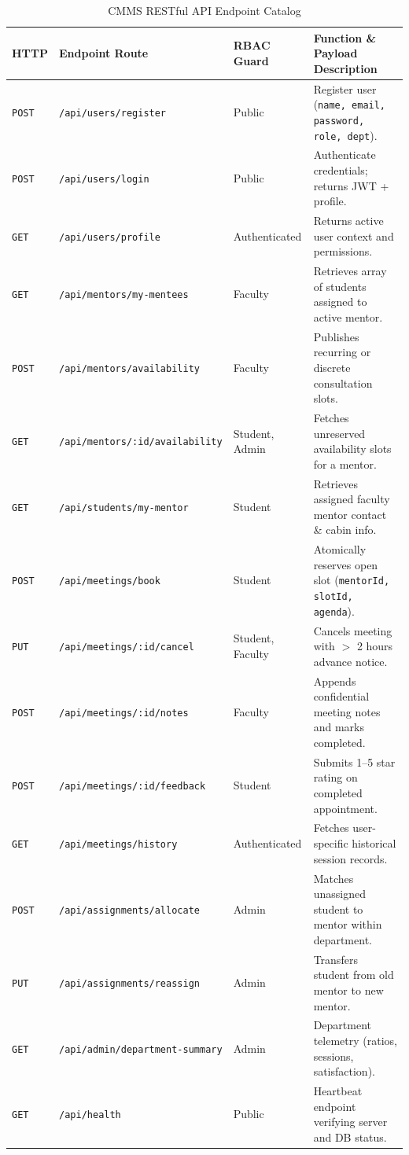 \documentclass[11pt,a4paper]{article}
\begin{document}
\begin{table}[H]
\centering
\footnotesize
\begin{tabularx}{\textwidth}{lp{4.2cm}lp{4.8cm}}
\toprule
\rowcolor{lightgray} \textbf{HTTP} & \textbf{Endpoint Route} & \textbf{RBAC Guard} & \textbf{Function \& Payload Description} \\
\midrule
\texttt{POST} & \texttt{/api/users/register} & Public & Register user (\texttt{name, email, password, role, dept}). \\
\texttt{POST} & \texttt{/api/users/login} & Public & Authenticate credentials; returns JWT + profile. \\
\texttt{GET}  & \texttt{/api/users/profile} & Authenticated & Returns active user context and permissions. \\
\midrule
\texttt{GET}  & \texttt{/api/mentors/my-mentees} & Faculty & Retrieves array of students assigned to active mentor. \\
\texttt{POST} & \texttt{/api/mentors/availability} & Faculty & Publishes recurring or discrete consultation slots. \\
\texttt{GET}  & \texttt{/api/mentors/:id/availability}& Student, Admin & Fetches unreserved availability slots for a mentor. \\
\midrule
\texttt{GET}  & \texttt{/api/students/my-mentor} & Student & Retrieves assigned faculty mentor contact \& cabin info. \\
\midrule
\texttt{POST} & \texttt{/api/meetings/book} & Student & Atomically reserves open slot (\texttt{mentorId, slotId, agenda}). \\
\texttt{PUT}  & \texttt{/api/meetings/:id/cancel} & Student, Faculty & Cancels meeting with $>$ 2 hours advance notice. \\
\texttt{POST} & \texttt{/api/meetings/:id/notes} & Faculty & Appends confidential meeting notes and marks completed. \\
\texttt{POST} & \texttt{/api/meetings/:id/feedback}& Student & Submits 1--5 star rating on completed appointment. \\
\texttt{GET}  & \texttt{/api/meetings/history} & Authenticated & Fetches user-specific historical session records. \\
\midrule
\texttt{POST} & \texttt{/api/assignments/allocate} & Admin & Matches unassigned student to mentor within department. \\
\texttt{PUT}  & \texttt{/api/assignments/reassign} & Admin & Transfers student from old mentor to new mentor. \\
\texttt{GET}  & \texttt{/api/admin/department-summary}& Admin & Department telemetry (ratios, sessions, satisfaction). \\
\texttt{GET}  & \texttt{/api/health} & Public & Heartbeat endpoint verifying server and DB status. \\
\bottomrule
\end{tabularx}
\caption{CMMS RESTful API Endpoint Catalog}
\label{tab:api_spec}
\end{table}
\end{document}
